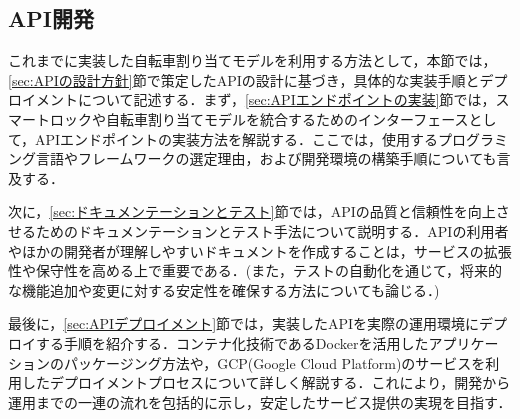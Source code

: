   \subsection{API開発}
    \label{sec:API開発}
      \par これまでに実装した自転車割り当てモデルを利用する方法として，本節では，\ref{sec:APIの設計方針}節で策定したAPIの設計に基づき，具体的な実装手順とデプロイメントについて記述する．まず，\ref{sec:APIエンドポイントの実装}節では，スマートロックや自転車割り当てモデルを統合するためのインターフェースとして，APIエンドポイントの実装方法を解説する．ここでは，使用するプログラミング言語やフレームワークの選定理由，および開発環境の構築手順についても言及する．
      \par 次に，\ref{sec:ドキュメンテーションとテスト}節では，APIの品質と信頼性を向上させるためのドキュメンテーションとテスト手法について説明する．APIの利用者やほかの開発者が理解しやすいドキュメントを作成することは，サービスの拡張性や保守性を高める上で重要である．(また，テストの自動化を通じて，将来的な機能追加や変更に対する安定性を確保する方法についても論じる．)
      \par 最後に，\ref{sec:APIデプロイメント}節では，実装したAPIを実際の運用環境にデプロイする手順を紹介する．コンテナ化技術であるDockerを活用したアプリケーションのパッケージング方法や，GCP(Google Cloud Platform)のサービスを利用したデプロイメントプロセスについて詳しく解説する．これにより，開発から運用までの一連の流れを包括的に示し，安定したサービス提供の実現を目指す．
      
